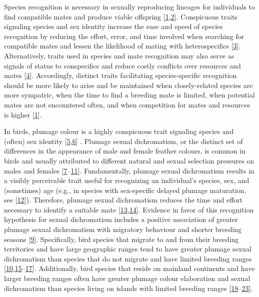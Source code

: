 \documentclass[
  a4paper,
]{article}
\begin{document}
Species recognition is necessary in sexually reproducing lineages for
individuals to find compatible mates and produce viable offspring
{[}\protect\hyperlink{ref-andersson1994}{1},\protect\hyperlink{ref-groning2008}{2}{]}.
Conspicuous traits signaling species and sex identity increase the ease
and speed of species recognition by reducing the effort, error, and time
involved when searching for compatible mates and lessen the likelihood
of mating with heterospecifics
{[}\protect\hyperlink{ref-pfennig2012}{3}{]}. Alternatively, traits used
in species and mate recognition may also serve as signals of status to
conspecifics and reduce costly conflicts over resources and mates
{[}\protect\hyperlink{ref-west-eberhard1983}{4}{]}. Accordingly,
distinct traits facilitating species-specific recognition should be more
likely to arise and be maintained when closely-related species are more
sympatric, when the time to find a breeding mate is limited, when
potential mates are not encountered often, and when competition for
mates and resources is higher
{[}\protect\hyperlink{ref-andersson1994}{1}{]}.

In birds, plumage colour is a highly conspicuous trait signaling species
and (often) sex identity
{[}\protect\hyperlink{ref-martin2015a}{5},\protect\hyperlink{ref-bitton2016}{6}{]}
. Plumage sexual dichromatism, or the distinct set of differences in the
appearance of male and female feather colours, is common in birds and
usually attributed to different natural and sexual selection pressures
on males and females
{[}\protect\hyperlink{ref-martin1996}{7}--\protect\hyperlink{ref-dunn2015}{11}{]}.
Fundamentally, plumage sexual dichromatism results in a visibly
perceivable trait useful for recognizing an individual's species, sex,
and (sometimes) age (e.g., in species with sex-specific delayed plumage
maturation, see {[}\protect\hyperlink{ref-hawkins2012}{12}{]}).
Therefore, plumage sexual dichromatism reduces the time and effort
necessary to identify a suitable mate
{[}\protect\hyperlink{ref-hamilton1961}{13},\protect\hyperlink{ref-saetre1992}{14}{]}.
Evidence in favor of this recognition hypothesis for sexual dichromatism
includes a positive association of greater plumage sexual dichromatism
with migratory behaviour and shorter breeding seasons
{[}\protect\hyperlink{ref-badyaev2003}{9}{]}. Specifically, bird species
that migrate to and from their breeding territories and have large
geographic ranges tend to have greater plumage sexual dichromatism than
species that do not migrate and have limited breeding ranges
{[}\protect\hyperlink{ref-dale2015}{10},\protect\hyperlink{ref-friedman2009}{15}--\protect\hyperlink{ref-matysiokova2017}{17}{]}.
Additionally, bird species that reside on mainland continents and have
larger breeding ranges often have greater plumage colour elaboration and
sexual dichromatism than species living on islands with limited breeding
ranges
{[}\protect\hyperlink{ref-badyaev1998}{18}--\protect\hyperlink{ref-kearns2020}{23}{]}.
\end{document}
